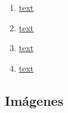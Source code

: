 \documentclass[12pt]{article}
\begin{document}
\begin{enumerate}
			\item 
			\label{bib: link12}
			\href{URL}{text}	

			\item 
			\label{bib: link12}
			\href{URL}{text}	

			\item 
			\label{bib: link12}
			\href{URL}{text}	

			\item 
			\label{bib: link12}
			\href{URL}{text}	
					
		\end{enumerate}
		
		\subsection*{Imágenes}
		
\end{document}
